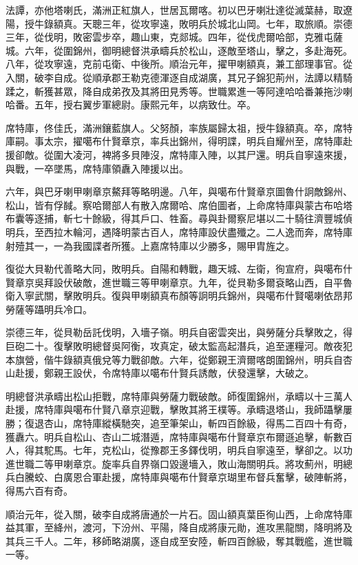\begin{pinyinscope}
法譚，亦他塔喇氏，滿洲正紅旗人，世居瓦爾喀。初以巴牙喇壯達從滅葉赫，取遼陽，授牛錄額真。天聰三年，從攻寧遠，敗明兵於城北山岡。七年，取旅順。崇德三年，從伐明，敗密雲步卒，趣山東，克郯城。四年，從伐虎爾哈部，克雅屯薩城。六年，從圍錦州，御明總督洪承疇兵於松山，逐敵至塔山，擊之，多赴海死。八年，從攻寧遠，克前屯衛、中後所。順治元年，擢甲喇額真，兼工部理事官。從入關，破李自成。從順承郡王勒克德渾逐自成湖廣，其兄子錦犯荊州，法譚以精騎蹂之，斬獲甚眾，降自成弟孜及其將田見秀等。世職累進一等阿達哈哈番兼拖沙喇哈番。五年，授右翼步軍總尉。康熙元年，以病致仕。卒。

席特庫，佟佳氏，滿洲鑲藍旗人。父努顏，率族屬歸太祖，授牛錄額真。卒，席特庫嗣。事太宗，擢噶布什賢章京，率兵出錦州，得明諜，明兵自耀州至，席特庫赴援卻敵。從圍大凌河，裨將多貝陣沒，席特庫入陣，以其尸還。明兵自寧遠來援，與戰，一卒墜馬，席特庫領纛入陣援以出。

六年，與巴牙喇甲喇章京鰲拜等略明邊。八年，與噶布什賢章京圖魯什詗敵錦州、松山，皆有俘馘。察哈爾部人有散入席爾哈、席伯圖者，上命席特庫與蒙古布哈塔布囊等逐捕，斬七十餘級，得其戶口、牲畜。尋與卦爾察尼堪以二十騎往濟豐城偵明兵，至西拉木輪河，遇降明蒙古百人，席特庫設伏盡殲之。二人逸而奔，席特庫射殪其一，一為我國諜者所獲。上嘉席特庫以少勝多，賜甲胄旌之。

復從大貝勒代善略大同，敗明兵。自陽和轉戰，趣天城、左衛，徇宣府，與噶布什賢章京吳拜設伏破敵，進世職三等甲喇章京。九年，從貝勒多爾袞略山西，自平魯衛入寧武關，擊敗明兵。復與甲喇額真布顏等詗明兵錦州，與噶布什賢噶喇依昂邦勞薩等躡明兵冷口。

崇德三年，從貝勒岳託伐明，入墻子嶺。明兵自密雲突出，與勞薩分兵擊敗之，得巨砲二十。復擊敗明總督吳阿衡，攻真定，破太監高起潛兵，追至運糧河。敵夜犯本旗營，偕牛錄額真俄兌等力戰卻敵。六年，從鄭親王濟爾喀朗圍錦州，明兵自杏山赴援，鄭親王設伏，令席特庫以噶布什賢兵誘敵，伏發還擊，大破之。

明總督洪承疇出松山拒戰，席特庫與勞薩力戰破敵。師復圍錦州，承疇以十三萬人赴援，席特庫與噶布什賢八章京迎戰，擊敗其將王樸等。承疇退塔山，我師躡擊屢勝；復退杏山，席特庫縱橫馳突，追至筆架山，斬四百餘級，得馬二百四十有奇，獲纛六。明兵自松山、杏山二城潛遁，席特庫與噶布什賢章京布爾遜追擊，斬數百人，得其駝馬。七年，克松山，從豫郡王多鐸伐明，明兵自寧遠至，擊卻之。以功進世職二等甲喇章京。旋率兵自界嶺口毀邊墻入，敗山海關明兵。將攻薊州，明總兵白騰蛟、白廣恩合軍赴援，席特庫與噶布什賢章京瑚里布督兵奮擊，破陣斬將，得馬六百有奇。

順治元年，從入關，破李自成將唐通於一片石。固山額真葉臣徇山西，上命席特庫益其軍，至絳州，渡河，下汾州、平陽，降自成將康元勛，進攻黑龍關，降明將及其兵三千人。二年，移師略湖廣，逐自成至安陸，斬四百餘級，奪其戰艦，進世職一等。


\end{pinyinscope}
